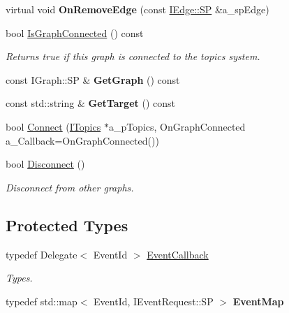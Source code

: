\begin{DoxyCompactItemize}
\mbox{\label{class_graph_connector_a6dd151551aa194ca2a68884a262f1722}} 
virtual void {\bfseries On\+Remove\+Edge} (const \hyperlink{class_i_graph_1_1_i_edge_adfae3ec3e377543685a06b9c5d5a776a}{I\+Edge\+::\+SP} \&a\+\_\+sp\+Edge)
\item 
\mbox{\label{class_graph_connector_a2278568365819a0636cd010f533605fd}} 
bool \hyperlink{class_graph_connector_a2278568365819a0636cd010f533605fd}{Is\+Graph\+Connected} () const
\begin{DoxyCompactList}\small\item\em Returns true if this graph is connected to the topics system. \end{DoxyCompactList}\item 
\mbox{\label{class_graph_connector_a1b9ac951d6efd38c4ba5b43ee2592cc8}} 
const I\+Graph\+::\+SP \& {\bfseries Get\+Graph} () const
\item 
\mbox{\label{class_graph_connector_ac58171a7b584737e70f96d375af4472f}} 
const std\+::string \& {\bfseries Get\+Target} () const
\item 
bool \hyperlink{class_graph_connector_aa6bd5d8802483cf784c2b81177f29c85}{Connect} (\hyperlink{class_i_topics}{I\+Topics} $\ast$a\+\_\+p\+Topics, On\+Graph\+Connected a\+\_\+\+Callback=On\+Graph\+Connected())
\item 
\mbox{\label{class_graph_connector_a7e9e85b346472cc02ef5caeaa7368b36}} 
bool \hyperlink{class_graph_connector_a7e9e85b346472cc02ef5caeaa7368b36}{Disconnect} ()
\begin{DoxyCompactList}\small\item\em Disconnect from other graphs. \end{DoxyCompactList}\end{DoxyCompactItemize}
\subsection*{Protected Types}
\begin{DoxyCompactItemize}
\item 
\mbox{\label{class_graph_connector_ae3147778dc8b51e6832b9ac12897df40}} 
typedef Delegate$<$ Event\+Id $>$ \hyperlink{class_graph_connector_ae3147778dc8b51e6832b9ac12897df40}{Event\+Callback}
\begin{DoxyCompactList}\small\item\em Types. \end{DoxyCompactList}\item 
\mbox{\label{class_graph_connector_aeea3848dfbfa3053d767ccb75901b93a}} 
typedef std\+::map$<$ Event\+Id, I\+Event\+Request\+::\+SP $>$ {\bfseries Event\+Map}
\end{DoxyCompactItemize}
